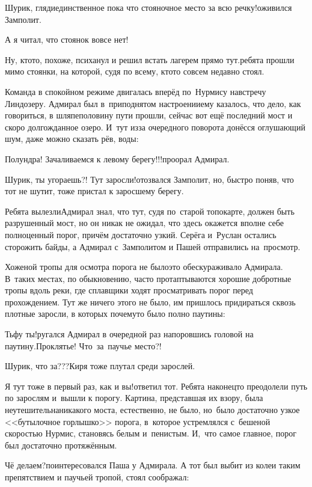 \diagdash Шурик, гляди\mdash единственное пока что стояночное место за всю речку!\mdash оживился Замполит.

\diagdash А я читал, что стоянок вовсе нет!

\diagdash Ну, кто\sdash то, похоже, психанул и решил встать лагерем прямо тут.\mdash ребята прошли мимо стоянки, на которой, судя по всему, кто\sdash то совсем недавно стоял.

Команда в спокойном режиме двигалась вперёд по~Нурмису навстречу Линдозеру. Адмирал был в~приподнятом настроении\mdash ему казалось, что дело, как говориться, в шляпе\mdash половину пути прошли, сейчас вот ещё последний мост и скоро долгожданное озеро. И~тут из\sdash за очередного поворота донёсся оглушающий шум, даже можно сказать рёв, воды:

\diagdash Полундра! Зачаливаемся к левому берегу!!!\mdash проорал Адмирал.

\diagdash Шурик, ты угораешь?! Тут заросли!\mdash отозвался Замполит, но, быстро поняв, что тот не шутит, тоже пристал к заросшему берегу.

Ребята вылезли\mdash Адмирал знал, что тут, судя по~старой топокарте, должен быть разрушенный мост, но он никак не ожидал, что здесь окажется вполне себе полноценный порог, причём достаточно узкий. Серёга и~Руслан остались сторожить байды, а Адмирал с~Замполитом и Пашей отправились на~просмотр. 

Хоженой тропы для осмотра порога не было\mdash это обескураживало Адмирала. В~таких местах, по обыкновению, часто протаптываются хорошие добротные тропы вдоль реки, где сплавщики ходят просматривать порог перед прохождением. Тут же ничего этого не было, им пришлось придираться сквозь плотные заросли, в которых почему\sdash то было полно паутины:

\diagdash Тьфу ты!\mdash ругался Адмирал в очередной раз напоровшись головой на паутину.\mdash Проклятье! Что~за~паучье место?!

\diagdash Шурик, что за???\mdash Киря тоже плутал среди зарослей.

\diagdash Я тут тоже в первый раз, как и вы!\mdash ответил тот. Ребята наконец\sdash то преодолели путь по зарослям и~вышли к порогу. Картина, представшая их взору, была неутешительна\mdash никакого моста, естественно, не было, но~было достаточно узкое <<бутылочное горлышко>> порога, в~которое устремлялся с~бешеной скоростью Нурмис, становясь белым и~пенистым. И,~что самое главное, порог был достаточно протяжённым. 

\diagdash Чё делаем?\mdash поинтересовался Паша у Адмирала. А тот был выбит из колеи таким препятствием и паучьей тропой, стоял соображал:

